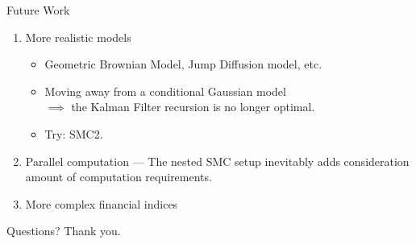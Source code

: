 \documentclass[handout]{beamer}
\begin{document}
\begin{frame}{Future Work}
\begin{enumerate}
\item More realistic models
  \begin{itemize}
   \item Geometric Brownian Model, Jump Diffusion model, etc.
   \item Moving away from a conditional Gaussian model \\$\implies$ the  Kalman Filter recursion is no longer optimal.
   \item Try: SMC2.
  \end{itemize}
\item Parallel computation --- The nested SMC setup inevitably adds consideration amount of computation requirements. 

\item More complex financial indices
\end{enumerate}
\end{frame}

\begin{frame}{Questions?}
Thank you.
\end{frame}
\end{document}
